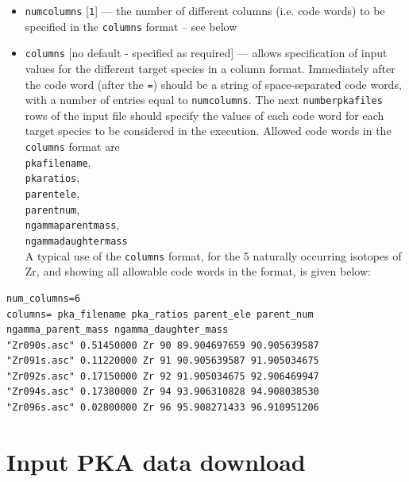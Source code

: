 \documentclass[a4paper]{article}
\begin{document}
\begin{itemize}
\item \texttt{num{\textunderscore}columns} [\texttt{1}] --- the number of different columns (i.e. code words) to be specified in the \texttt{columns} format -- see below
\item \texttt{columns} [no default - specified as required] --- allows specification of input values for the different target species in a column format. Immediately after the code word (after the \texttt{=}) should be a string of space-separated code words, with a number of entries equal to \texttt{num{\textunderscore}columns}. The next \texttt{number{\textunderscore}pka{\textunderscore}files} rows of the input file should specify the values of each code word for each target species to be considered in the execution. Allowed code words in the \texttt{columns} format are\\ \texttt{pka{\textunderscore}filename},\\\texttt{pka{\textunderscore}ratios},\\ \texttt{parent{\textunderscore}ele},\\\texttt{parent{\textunderscore}num},\\ \texttt{ngamma{\textunderscore}parent{\textunderscore}mass},\\ \texttt{ngamma{\textunderscore}daughter{\textunderscore}mass}\\
    A typical use of the \texttt{columns} format, for the 5 naturally occurring isotopes of Zr, and showing all allowable code words in the format, is given below:
\end{itemize}


{\footnotesize
\begin{verbatim}
num_columns=6
columns= pka_filename pka_ratios parent_ele parent_num ngamma_parent_mass ngamma_daughter_mass
"Zr090s.asc" 0.51450000 Zr 90 89.904697659 90.905639587
"Zr091s.asc" 0.11220000 Zr 91 90.905639587 91.905034675
"Zr092s.asc" 0.17150000 Zr 92 91.905034675 92.906469947
"Zr094s.asc" 0.17380000 Zr 94 93.906310828 94.908038530
"Zr096s.asc" 0.02800000 Zr 96 95.908271433 96.910951206
\end{verbatim}}



\section{Input PKA data download}
\end{document}
